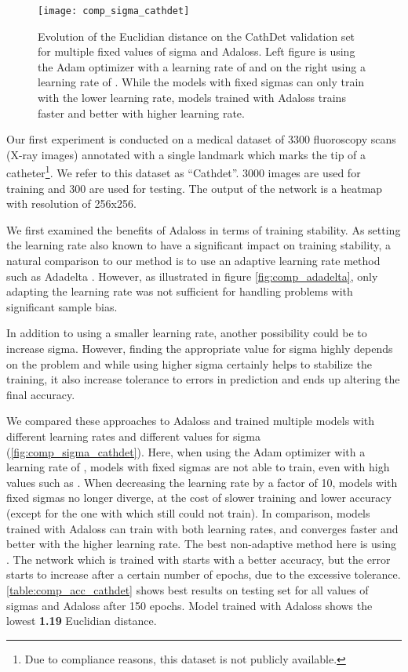 \documentclass[10pt,twocolumn,letterpaper]{article}
\begin{document}
\begin{figure*}[ht]
  \begin{center}
    \centering
	\texttt{[image: comp\_sigma\_cathdet]}
	\caption{Evolution of the Euclidian distance on the
          CathDet validation set for multiple fixed values of sigma
          and Adaloss. Left figure is using the Adam optimizer with a learning
          rate of  and on the right using a learning rate of .
          While the models with fixed sigmas can only train with the lower
          learning rate, models trained with Adaloss trains faster and better
          with higher learning rate.}
	\label{fig:comp_sigma_cathdet}
  \end{center}
\end{figure*}

Our first experiment is conducted on a medical dataset of 3300
fluoroscopy scans (X-ray images) annotated with a single landmark
which marks the tip of a catheter\footnote{Due to compliance reasons, this
dataset is not publicly available.}. We refer to this dataset as ``Cathdet''.
3000 images are used for training and 300 are used for testing. The output of the network
is a heatmap with resolution of 256x256.



We first examined the benefits of Adaloss in terms of training stability. As setting the learning rate
also known to have a significant impact on training stability, a natural
comparison to our method is to use an adaptive learning rate method such as Adadelta
\cite{adadelta}. However, as illustrated in figure \autoref{fig:comp_adadelta}, only adapting the learning rate was not sufficient for handling problems with significant sample bias. 

In addition to using a smaller
learning rate, another possibility could be to increase
sigma. However, finding the appropriate value for sigma highly depends
on the problem and while using higher sigma certainly helps to stabilize the
training, it also increase tolerance to errors in prediction and ends
up altering the final accuracy.

We compared these approaches to Adaloss and trained multiple models
with different learning rates and different values for sigma
(\autoref{fig:comp_sigma_cathdet}). Here, when using the Adam
optimizer with a learning rate of , models with fixed sigmas
are not able to train, even with high values such as .
When decreasing the learning rate by a factor of 10, models with fixed
sigmas no longer diverge, at the cost of slower training and lower
accuracy (except for the one with  which still could not
train). In comparison, models trained with Adaloss can train with both
learning rates, and converges faster and better with the higher
learning rate. The best non-adaptive method here is using
. The network which is trained with  starts
with a better accuracy, but the error starts to increase after a certain
number of epochs, due to the excessive tolerance.
\autoref{table:comp_acc_cathdet} shows best results on testing set for
all values of sigmas and Adaloss after 150 epochs. Model trained with
Adaloss shows the lowest \textbf{1.19} Euclidian distance.
\end{document}

